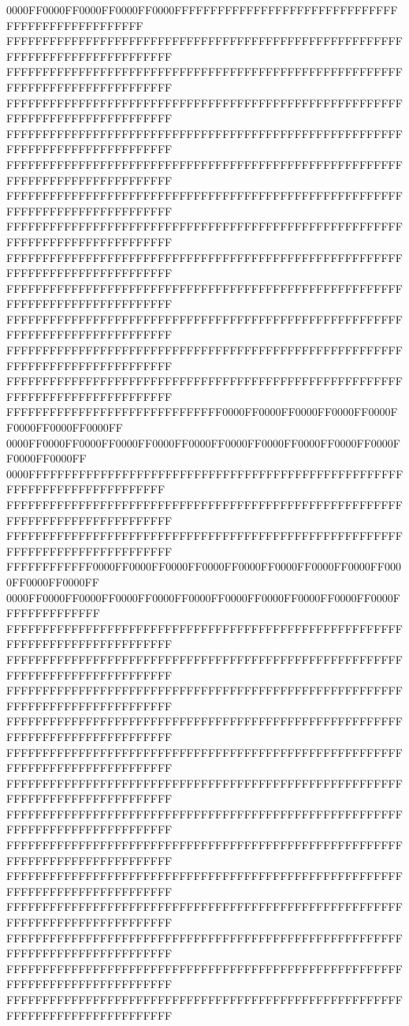 0000FF0000FF0000FF0000FF0000FFFFFFFFFFFFFFFFFFFFFFFFFFFFFFFFFFFFFFFFFFFFFFFFFF
FFFFFFFFFFFFFFFFFFFFFFFFFFFFFFFFFFFFFFFFFFFFFFFFFFFFFFFFFFFFFFFFFFFFFFFFFFFFFF
FFFFFFFFFFFFFFFFFFFFFFFFFFFFFFFFFFFFFFFFFFFFFFFFFFFFFFFFFFFFFFFFFFFFFFFFFFFFFF
FFFFFFFFFFFFFFFFFFFFFFFFFFFFFFFFFFFFFFFFFFFFFFFFFFFFFFFFFFFFFFFFFFFFFFFFFFFFFF
FFFFFFFFFFFFFFFFFFFFFFFFFFFFFFFFFFFFFFFFFFFFFFFFFFFFFFFFFFFFFFFFFFFFFFFFFFFFFF
FFFFFFFFFFFFFFFFFFFFFFFFFFFFFFFFFFFFFFFFFFFFFFFFFFFFFFFFFFFFFFFFFFFFFFFFFFFFFF
FFFFFFFFFFFFFFFFFFFFFFFFFFFFFFFFFFFFFFFFFFFFFFFFFFFFFFFFFFFFFFFFFFFFFFFFFFFFFF
FFFFFFFFFFFFFFFFFFFFFFFFFFFFFFFFFFFFFFFFFFFFFFFFFFFFFFFFFFFFFFFFFFFFFFFFFFFFFF
FFFFFFFFFFFFFFFFFFFFFFFFFFFFFFFFFFFFFFFFFFFFFFFFFFFFFFFFFFFFFFFFFFFFFFFFFFFFFF
FFFFFFFFFFFFFFFFFFFFFFFFFFFFFFFFFFFFFFFFFFFFFFFFFFFFFFFFFFFFFFFFFFFFFFFFFFFFFF
FFFFFFFFFFFFFFFFFFFFFFFFFFFFFFFFFFFFFFFFFFFFFFFFFFFFFFFFFFFFFFFFFFFFFFFFFFFFFF
FFFFFFFFFFFFFFFFFFFFFFFFFFFFFFFFFFFFFFFFFFFFFFFFFFFFFFFFFFFFFFFFFFFFFFFFFFFFFF
FFFFFFFFFFFFFFFFFFFFFFFFFFFFFFFFFFFFFFFFFFFFFFFFFFFFFFFFFFFFFFFFFFFFFFFFFFFFFF
FFFFFFFFFFFFFFFFFFFFFFFFFFFFFF0000FF0000FF0000FF0000FF0000FF0000FF0000FF0000FF
0000FF0000FF0000FF0000FF0000FF0000FF0000FF0000FF0000FF0000FF0000FF0000FF0000FF
0000FFFFFFFFFFFFFFFFFFFFFFFFFFFFFFFFFFFFFFFFFFFFFFFFFFFFFFFFFFFFFFFFFFFFFFFFFF
FFFFFFFFFFFFFFFFFFFFFFFFFFFFFFFFFFFFFFFFFFFFFFFFFFFFFFFFFFFFFFFFFFFFFFFFFFFFFF
FFFFFFFFFFFFFFFFFFFFFFFFFFFFFFFFFFFFFFFFFFFFFFFFFFFFFFFFFFFFFFFFFFFFFFFFFFFFFF
FFFFFFFFFFFF0000FF0000FF0000FF0000FF0000FF0000FF0000FF0000FF0000FF0000FF0000FF
0000FF0000FF0000FF0000FF0000FF0000FF0000FF0000FF0000FF0000FF0000FFFFFFFFFFFFFF
FFFFFFFFFFFFFFFFFFFFFFFFFFFFFFFFFFFFFFFFFFFFFFFFFFFFFFFFFFFFFFFFFFFFFFFFFFFFFF
FFFFFFFFFFFFFFFFFFFFFFFFFFFFFFFFFFFFFFFFFFFFFFFFFFFFFFFFFFFFFFFFFFFFFFFFFFFFFF
FFFFFFFFFFFFFFFFFFFFFFFFFFFFFFFFFFFFFFFFFFFFFFFFFFFFFFFFFFFFFFFFFFFFFFFFFFFFFF
FFFFFFFFFFFFFFFFFFFFFFFFFFFFFFFFFFFFFFFFFFFFFFFFFFFFFFFFFFFFFFFFFFFFFFFFFFFFFF
FFFFFFFFFFFFFFFFFFFFFFFFFFFFFFFFFFFFFFFFFFFFFFFFFFFFFFFFFFFFFFFFFFFFFFFFFFFFFF
FFFFFFFFFFFFFFFFFFFFFFFFFFFFFFFFFFFFFFFFFFFFFFFFFFFFFFFFFFFFFFFFFFFFFFFFFFFFFF
FFFFFFFFFFFFFFFFFFFFFFFFFFFFFFFFFFFFFFFFFFFFFFFFFFFFFFFFFFFFFFFFFFFFFFFFFFFFFF
FFFFFFFFFFFFFFFFFFFFFFFFFFFFFFFFFFFFFFFFFFFFFFFFFFFFFFFFFFFFFFFFFFFFFFFFFFFFFF
FFFFFFFFFFFFFFFFFFFFFFFFFFFFFFFFFFFFFFFFFFFFFFFFFFFFFFFFFFFFFFFFFFFFFFFFFFFFFF
FFFFFFFFFFFFFFFFFFFFFFFFFFFFFFFFFFFFFFFFFFFFFFFFFFFFFFFFFFFFFFFFFFFFFFFFFFFFFF
FFFFFFFFFFFFFFFFFFFFFFFFFFFFFFFFFFFFFFFFFFFFFFFFFFFFFFFFFFFFFFFFFFFFFFFFFFFFFF
FFFFFFFFFFFFFFFFFFFFFFFFFFFFFFFFFFFFFFFFFFFFFFFFFFFFFFFFFFFFFFFFFFFFFFFFFFFFFF
FFFFFFFFFFFFFFFFFFFFFFFFFFFFFFFFFFFFFFFFFFFFFFFFFFFFFFFFFFFFFFFFFFFFFFFFFFFFFF
